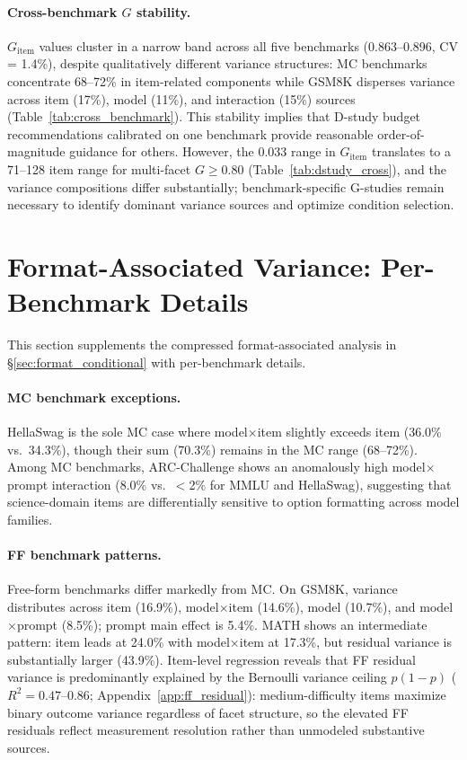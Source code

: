 \paragraph{Cross-benchmark $G$ stability.}
\label{app:cross_benchmark_transfer}
$G_\text{item}$ values cluster in a narrow band across all five benchmarks (0.863--0.896, CV = 1.4\%), despite qualitatively different variance structures: MC benchmarks concentrate 68--72\% in item-related components while GSM8K disperses variance across item (17\%), model (11\%), and interaction (15\%) sources (Table~\ref{tab:cross_benchmark}). This stability implies that D-study budget recommendations calibrated on one benchmark provide reasonable order-of-magnitude guidance for others. However, the 0.033 range in $G_\text{item}$ translates to a 71--128 item range for multi-facet $G \geq 0.80$ (Table~\ref{tab:dstudy_cross}), and the variance compositions differ substantially; benchmark-specific G-studies remain necessary to identify dominant variance sources and optimize condition selection.

\section{Format-Associated Variance: Per-Benchmark Details}
\label{app:format_details}

This section supplements the compressed format-associated analysis in \S\ref{sec:format_conditional} with per-benchmark details.

\paragraph{MC benchmark exceptions.} HellaSwag is the sole MC case where model$\times$item slightly exceeds item (36.0\% vs.\ 34.3\%), though their sum (70.3\%) remains in the MC range (68--72\%). Among MC benchmarks, ARC-Challenge shows an anomalously high model$\times$prompt interaction (8.0\% vs.\ $<$2\% for MMLU and HellaSwag), suggesting that science-domain items are differentially sensitive to option formatting across model families.

\paragraph{FF benchmark patterns.} Free-form benchmarks differ markedly from MC. On GSM8K, variance distributes across item (16.9\%), model$\times$item (14.6\%), model (10.7\%), and model$\times$prompt (8.5\%); prompt main effect is 5.4\%. MATH shows an intermediate pattern: item leads at 24.0\% with model$\times$item at 17.3\%, but residual variance is substantially larger (43.9\%). Item-level regression reveals that FF residual variance is predominantly explained by the Bernoulli variance ceiling $p(1{-}p)$ ($R^2 = 0.47$--$0.86$; Appendix~\ref{app:ff_residual}): medium-difficulty items maximize binary outcome variance regardless of facet structure, so the elevated FF residuals reflect measurement resolution rather than unmodeled substantive sources.

